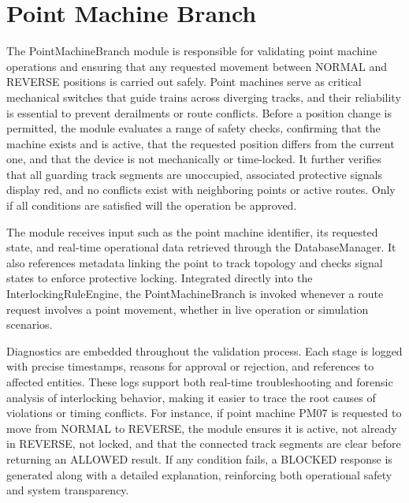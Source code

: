 \section{Point Machine Branch}
\label{sec:methodology:point-machine-branch}

The PointMachineBranch module is responsible for validating point machine operations and ensuring that any requested movement between NORMAL and REVERSE positions is carried out safely. Point machines serve as critical mechanical switches that guide trains across diverging tracks, and their reliability is essential to prevent derailments or route conflicts. Before a position change is permitted, the module evaluates a range of safety checks, confirming that the machine exists and is active, that the requested position differs from the current one, and that the device is not mechanically or time-locked. It further verifies that all guarding track segments are unoccupied, associated protective signals display red, and no conflicts exist with neighboring points or active routes. Only if all conditions are satisfied will the operation be approved.

The module receives input such as the point machine identifier, its requested state, and real-time operational data retrieved through the DatabaseManager. It also references metadata linking the point to track topology and checks signal states to enforce protective locking. Integrated directly into the InterlockingRuleEngine, the PointMachineBranch is invoked whenever a route request involves a point movement, whether in live operation or simulation scenarios.

Diagnostics are embedded throughout the validation process. Each stage is logged with precise timestamps, reasons for approval or rejection, and references to affected entities. These logs support both real-time troubleshooting and forensic analysis of interlocking behavior, making it easier to trace the root causes of violations or timing conflicts. For instance, if point machine PM07 is requested to move from NORMAL to REVERSE, the module ensures it is active, not already in REVERSE, not locked, and that the connected track segments are clear before returning an ALLOWED result. If any condition fails, a BLOCKED response is generated along with a detailed explanation, reinforcing both operational safety and system transparency.